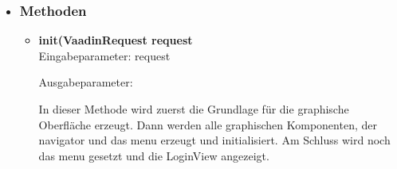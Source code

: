 \begin{itemize}
\begin{itemize}
\end{itemize}

\item \subsubsection{Methoden}
\begin{itemize}
\item \textbf{init(VaadinRequest request} \hfill\\ 
Eingabeparameter: request

Ausgabeparameter:

In dieser Methode wird zuerst die Grundlage für die graphische Oberfläche erzeugt. Dann werden alle graphischen Komponenten, der navigator und das menu erzeugt und initialisiert. Am Schluss wird noch das menu gesetzt und die LoginView angezeigt.

\end{itemize}

\end{itemize}